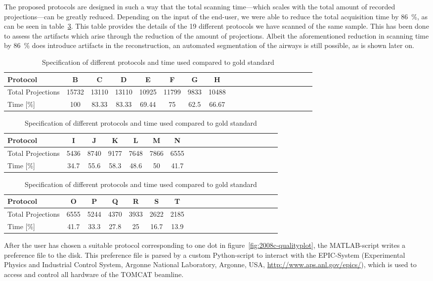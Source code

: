 The proposed protocols are designed in such a way that the total scanning time---which scales with the total amount of recorded projections---can be greatly reduced. Depending on the input of the end-user, we were able to reduce the total acquisition time by \SI{86}{\percent}, as can be seen in table~\ref{tab:projections}. This table provides the details of the 19 different protocols we have scanned of the same sample. This has been done to assess the artifacts which arise through the reduction of the amount of projections. Albeit the aforementioned reduction in scanning time by \SI{86}{\percent} does introduce artifacts in the reconstruction, an automated segmentation of the airways is still possible, as is shown later on.

\begin{table}
\centering
	\caption{Specification of different protocols and time used compared to gold standard}
	\begin{tabular*}{\textwidth}{l@{\extracolsep\fill}ccccccccccccccccccc}
		\toprule
		Protocol 			& B & C & D & E & F & G & H\\
		\midrule
		Total Projections 	& 15732 & 13110 & 13110 & 10925 & 11799 & 9833 & 10488\\
		Time [\%] 			& 100 & 83.33 & 83.33 & 69.44 & 75 & 62.5 & 66.67\\
		\bottomrule
	\end{tabular*}
	\begin{tabular*}{\textwidth}{l@{\extracolsep\fill}ccccccccccccccccccc}
		\toprule
		Protocol 			& I & J & K & L & M & N \\
		\midrule
		Total Projections 	& 5436 & 8740 & 9177 & 7648 & 7866 & 6555 \\
		Time [\%] 			& 34.7 & 55.6 & 58.3 & 48.6 & 50 & 41.7 \\
 		\bottomrule
	\end{tabular*}
	\begin{tabular*}{\textwidth}{l@{\extracolsep\fill}ccccccccccccccccccc}
		\toprule
		Protocol 			& O & P & Q & R & S & T \\
		\midrule
		Total Projections 	& 6555 & 5244 & 4370 & 3933 & 2622 & 2185 \\
		Time [\%] 			& 41.7 & 33.3 & 27.8 & 25 & 16.7 & 13.9 \\
		\bottomrule
	\end{tabular*}
	\label{tab:projections}
\end{table}

After the user has chosen a suitable protocol corresponding to one dot in figure~\ref{fig:2008c-qualityplot}, the MATLAB-script writes a preference file to the disk. This preference file is parsed by a custom Python-script to interact with the EPIC-System (Experimental Physics and Industrial Control System, Argonne National Laboratory, Argonne, USA, \url{http://www.aps.anl.gov/epics/}), which is used to access and control all hardware of the TOMCAT beamline.

